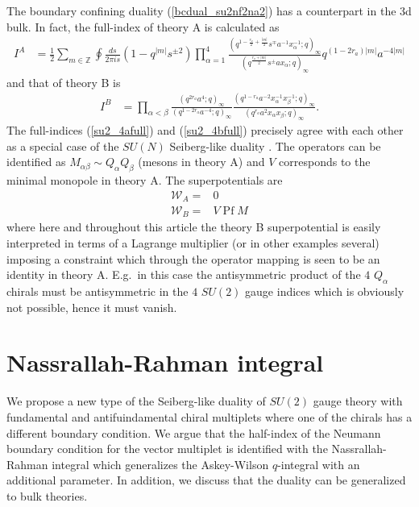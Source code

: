 \documentclass[12pt]{article}
\newcommand{\Wcal}{\mathcal{W}}
\newcommand{\Pf}{\operatorname{Pf}}
\numberwithin{equation}{section}
\begin{document}
The boundary confining duality (\ref{bcdual_su2nf2na2}) has a counterpart in the 3d bulk. 
In fact, the full-index of theory A is calculated as
\begin{align}
\label{su2_4afull}
I^A&=
\frac12 \sum_{m\in \mathbb{Z}}
\oint \frac{ds}{2\pi is}
(1-q^{|m|}s^{\pm 2})
\prod_{\alpha=1}^{4}
\frac{
(q^{1-\frac{r_a}{2}+\frac{|m|}{2}}s^{\mp}a^{-1}x_{\alpha}^{-1};q)_{\infty}
}
{
(q^{\frac{r_a+|m|}{2}}s^{\pm}ax_{\alpha};q)_{\infty}
}
q^{(1-2r_a)|m|} a^{-4|m|}
\end{align}
and that of theory B is 
\begin{align}
\label{su2_4bfull}
I^B&=\prod_{\alpha<\beta}
\frac{(q^{2r_a}a^4;q)_{\infty}}
{(q^{1-2r_a}a^{-4};q)_{\infty}}
\frac{(q^{1-r_a}a^{-2}x_{\alpha}^{-1}x_{\beta}^{-1};q)_{\infty}}
{(q^{r_a}a^{2}x_{\alpha}x_{\beta};q)_{\infty}}. 
\end{align}
The full-indices (\ref{su2_4afull}) and (\ref{su2_4bfull}) precisely agree with each other as a special case of the $SU(N)$ Seiberg-like duality \cite{Aharony:2013kma,Park:2013wta}. 
The operators can be identified as $M_{\alpha \beta} \sim Q_{\alpha} Q_{\beta}$ (mesons in theory A) and $V$ corresponds to the minimal monopole in theory A.
The superpotentials are
\begin{align}
    \Wcal_A = & 0 \\
    \Wcal_B = & V \Pf M
\end{align}
where here and throughout this article the theory B superpotential is easily interpreted in terms of a Lagrange multiplier (or in other examples several) imposing a constraint which through the operator mapping is seen to be an identity in theory A. E.g.\ in this case the antisymmetric product of the $4$ $Q_{\alpha}$ chirals must be antisymmetric in the $4$ $SU(2)$ gauge indices which is obviously not possible, hence it must vanish.

\section{Nassrallah-Rahman integral}
\label{sec_NR_integral}
We propose a new type of the Seiberg-like duality of $SU(2)$ gauge theory with fundamental and antifuindamental chiral multiplets where one of the chirals has a different boundary condition. We argue that the half-index of the Neumann boundary condition for the vector multiplet is identified with the Nassrallah-Rahman integral \cite{MR772878,MR845667} which generalizes the Askey-Wilson $q$-integral with an additional parameter. In addition, we discuss that the duality can be generalized to bulk theories. 
\end{document}
